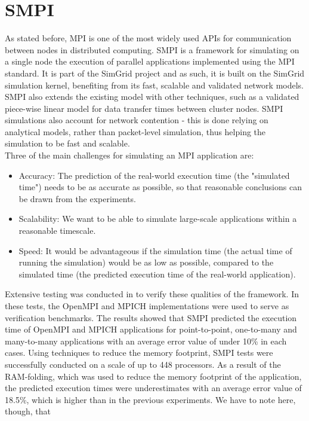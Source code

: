\section{SMPI}
As stated before, MPI is one of the most widely used APIs for
communication between nodes in distributed computing. SMPI is a
framework for simulating on a single node the execution of parallel
applications implemented using the MPI standard. It is part of the
SimGrid project and as such, it is built on the SimGrid simulation
kernel, benefiting from its fast, scalable and validated network
models. SMPI also extends the existing model with other techniques,
such as a validated piece-wise linear model for data transfer times
between cluster nodes. SMPI simulations also account for network
contention - this is done relying on analytical models, rather than
packet-level simulation, thus helping the simulation to be fast and
scalable.\cite{csgscq11}\\
Three of the main challenges for simulating an MPI application are:
\begin{itemize}
\item Accuracy: The prediction of the real-world execution time (the
  "simulated time") needs to be as accurate as possible, so that
  reasonable conclusions can be drawn from the experiments.
\item Scalability: We want to be able to simulate large-scale
  applications within a reasonable timescale.
\item Speed: It would be advantageous if the simulation time (the
  actual time of running the simulation) would be as low as possible,
  compared to the simulated time (the predicted execution time of the
  real-world application).
\end{itemize}
Extensive testing was conducted in \cite{csgscq11} to verify these
qualities of the framework. In these tests, the OpenMPI and MPICH
implementations were used to serve as verification benchmarks. The
results showed that SMPI predicted the execution time of OpenMPI and
MPICH applications for point-to-point, one-to-many and many-to-many
applications with an average error value of under 10\% in each
cases. Using techniques to reduce the memory footprint, SMPI tests
were successfully conducted on a scale of up to 448 processors. As a
result of the RAM-folding, which was used to reduce the memory
footprint of the application, the predicted execution times were
underestimates with an average error value of 18.5\%, which is higher
than in the previous experiments. We have to note here, though, that
